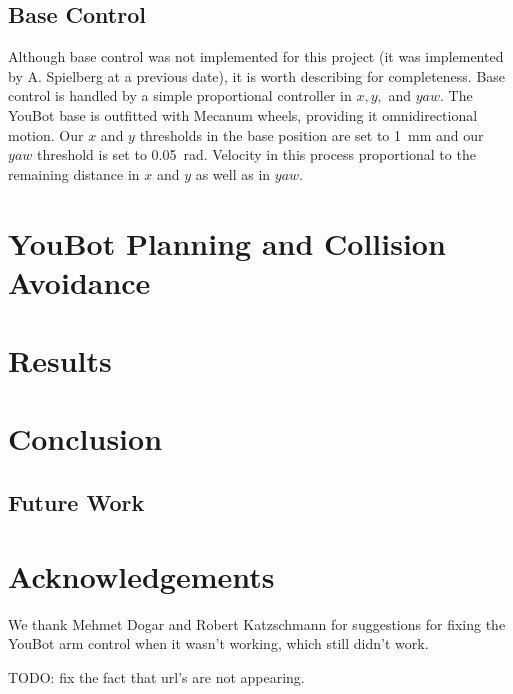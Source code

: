 \documentclass[conference]{acmsiggraph}
\begin{document}
\subsection{Base Control}
Although base control was not implemented for this project (it was implemented by A. Spielberg at a previous date), it is worth describing for completeness.  Base control is handled by a simple proportional controller in $x, y,$ and $yaw$.   The YouBot base is outfitted with Mecanum wheels, providing it omnidirectional motion.  Our $x$ and $y$ thresholds in the base position are set to 1~mm and our $yaw$ threshold is set to 0.05~rad.  Velocity in this process proportional to the remaining distance in $x$ and $y$ as well as in $yaw$.

\section{YouBot Planning and Collision Avoidance}

\section{Results}

\section{Conclusion}

\subsection{Future Work}



\section*{Acknowledgements}

We thank Mehmet Dogar and Robert Katzschmann for suggestions for fixing the YouBot arm control when it wasn't working, which still didn't work.






TODO: fix the fact that url's are not appearing.
\end{document}
